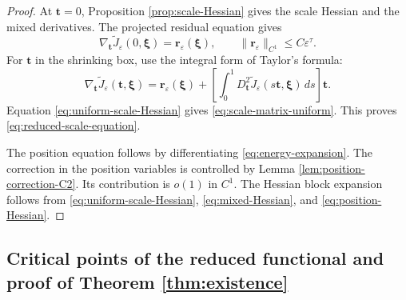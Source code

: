 \documentclass[11pt]{article}
\numberwithin{equation}{section}
\begin{document}
\begin{proof}
At $\boldsymbol t=0$, Proposition \ref{prop:scale-Hessian} gives
the scale Hessian and the mixed derivatives. The projected residual
equation gives
\begin{equation*}
\nabla_{\boldsymbol t}\widetilde J_\varepsilon(0,\boldsymbol\xi)
=\boldsymbol r_\varepsilon(\boldsymbol\xi),
\qquad
\|\boldsymbol r_\varepsilon\|_{C^1}\leq C\varepsilon^\tau.
\end{equation*}
For $\boldsymbol t$ in the shrinking box, use the integral form of
Taylor's formula:
\begin{equation*}
\nabla_{\boldsymbol t}\widetilde J_\varepsilon(\boldsymbol t,\boldsymbol\xi)
=
\boldsymbol r_\varepsilon(\boldsymbol\xi)
+\left[
\int_0^1
D_{\boldsymbol t}^2\widetilde J_\varepsilon
(s\boldsymbol t,\boldsymbol\xi)\,ds
\right]\boldsymbol t.
\end{equation*}
Equation \eqref{eq:uniform-scale-Hessian} gives
\eqref{eq:scale-matrix-uniform}. This proves
\eqref{eq:reduced-scale-equation}.

The position equation follows by differentiating
\eqref{eq:energy-expansion}. The correction in the position variables is controlled by Lemma
\ref{lem:position-correction-C2}. Its contribution is $o(1)$ in
$C^1$. The Hessian block expansion follows from
\eqref{eq:uniform-scale-Hessian}, \eqref{eq:mixed-Hessian}, and
\eqref{eq:position-Hessian}.
\end{proof}

\subsection{Critical points of the reduced functional and proof of Theorem \ref{thm:existence}}
\end{document}

